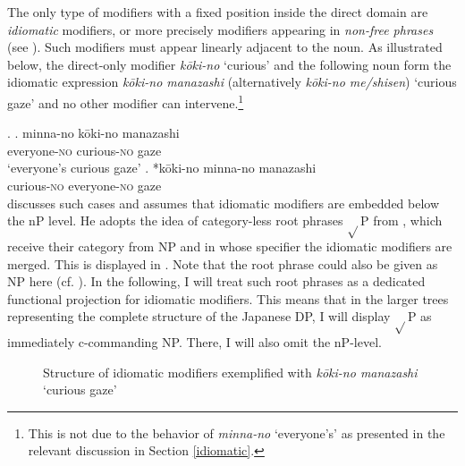 The only type of modifiers with a fixed position inside the direct domain are \textit{idiomatic} modifiers, or more precisely modifiers appearing in \textit{non-free phrases} (see \citealt{kohlich:2024:nonfree}). Such modifiers must appear linearly adjacent to the noun. As illustrated below, the direct-only modifier \textit{kōki-no} `curious' and the following noun form the idiomatic expression \textit{kōki-no manazashi} (alternatively \textit{kōki-no me/shisen}) `curious gaze' and no other modifier can intervene.\footnote{This is not due to the behavior of \textit{minna-no} `everyone's' as presented in the relevant discussion in Section \ref{idiomatic}.}

\ex. \ag. minna-no kōki-no manazashi\\
everyone-\textsc{no} curious-\textsc{no} gaze\\
`everyone's curious gaze'
\bg. *kōki-no minna-no manazashi\\
curious-\textsc{no} everyone-\textsc{no} gaze\\

\newpage
\citet{svenonius:2008:position} discusses such cases and assumes that idiomatic modifiers are embedded below the nP level. He adopts the idea of category-less root phrases $\sqrt{}$P from \citet{marantz:1997:no}, which receive their category from NP and in whose specifier the idiomatic modifiers are merged. This is displayed in . Note that the root phrase could also be given as NP here (cf. \citealt[37]{svenonius:2008:position}). In the following, I will treat such root phrases as a dedicated functional projection for idiomatic modifiers. This means that in the larger trees representing the complete structure of the Japanese DP, I will display $\sqrt{}$P as immediately c-commanding NP. There, I will also omit the nP-level.

\begin{figure}
\centering
{}
\caption{Structure of idiomatic modifiers exemplified with \textit{kōki-no manazashi} `curious gaze'}
\label{Structure idiomatic modifiers}
\end{figure}

